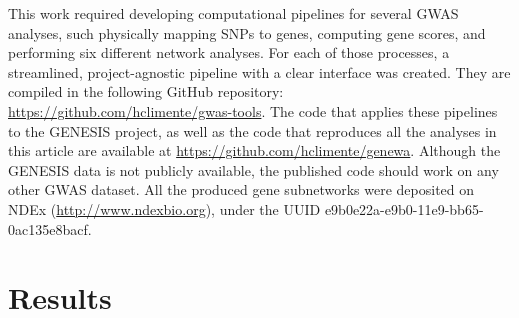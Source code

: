 \documentclass[twocolumn, 10pt]{article}
\begin{document}
This work required developing computational pipelines for several GWAS analyses, such physically mapping SNPs to genes, computing gene scores, and performing six different network analyses. For each of those processes, a streamlined, project-agnostic pipeline with a clear interface was created. They are compiled in the following GitHub repository: \url{https://github.com/hclimente/gwas-tools}. The code that applies these pipelines to the GENESIS project, as well as the code that reproduces all the analyses in this article are available at \url{https://github.com/hclimente/genewa}. Although the GENESIS data is not publicly available, the published code should work on any other GWAS dataset. All the produced gene subnetworks were deposited on NDEx (\url{http://www.ndexbio.org}), under the UUID e9b0e22a-e9b0-11e9-bb65-0ac135e8bacf.

\section{Results}
\label{sec:orgc718f04}
\end{document}
